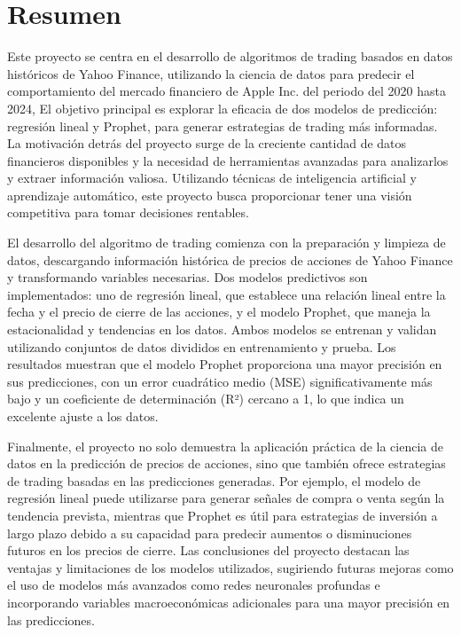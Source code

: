 
\section{Resumen}
Este proyecto se centra en el desarrollo de algoritmos de trading basados en datos históricos de Yahoo Finance, utilizando la ciencia de datos para predecir el comportamiento del mercado financiero de Apple Inc. del periodo del 2020 hasta 2024, El objetivo principal es explorar la eficacia de dos modelos de predicción: regresión lineal y Prophet, para generar estrategias de trading más informadas. La motivación detrás del proyecto surge de la creciente cantidad de datos financieros disponibles y la necesidad de herramientas avanzadas para analizarlos y extraer información valiosa. Utilizando técnicas de inteligencia artificial y aprendizaje automático, este proyecto busca proporcionar tener una visión competitiva para tomar decisiones rentables.

El desarrollo del algoritmo de trading comienza con la preparación y limpieza de datos, descargando información histórica de precios de acciones de Yahoo Finance y transformando variables necesarias. Dos modelos predictivos son implementados: uno de regresión lineal, que establece una relación lineal entre la fecha y el precio de cierre de las acciones, y el modelo Prophet, que maneja la estacionalidad y tendencias en los datos. Ambos modelos se entrenan y validan utilizando conjuntos de datos divididos en entrenamiento y prueba. Los resultados muestran que el modelo Prophet proporciona una mayor precisión en sus predicciones, con un error cuadrático medio (MSE) significativamente más bajo y un coeficiente de determinación (R²) cercano a 1, lo que indica un excelente ajuste a los datos.

Finalmente, el proyecto no solo demuestra la aplicación práctica de la ciencia de datos en la predicción de precios de acciones, sino que también ofrece estrategias de trading basadas en las predicciones generadas. Por ejemplo, el modelo de regresión lineal puede utilizarse para generar señales de compra o venta según la tendencia prevista, mientras que Prophet es útil para estrategias de inversión a largo plazo debido a su capacidad para predecir aumentos o disminuciones futuros en los precios de cierre. Las conclusiones del proyecto destacan las ventajas y limitaciones de los modelos utilizados, sugiriendo futuras mejoras como el uso de modelos más avanzados como redes neuronales profundas e incorporando variables macroeconómicas adicionales para una mayor precisión en las predicciones.

